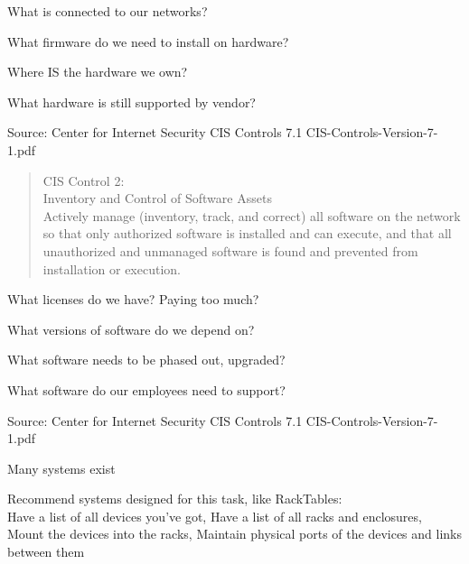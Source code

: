 \documentclass[Screen16to9,17pt]{foils}
\begin{document}
\begin{list1}
\item What is connected to our networks?
\item What firmware do we need to install on hardware?
\item Where IS the hardware we own?
\item What hardware is still supported by vendor?
\end{list1}

Source: Center for Internet Security CIS Controls 7.1 CIS-Controls-Version-7-1.pdf



\begin{quote}
CIS Control 2:\\
Inventory and Control of Software Assets\\
Actively manage (inventory, track, and correct) all software on the network so that only authorized software is installed and can execute, and that all unauthorized and unmanaged software is found and prevented from installation or execution.
\end{quote}

\begin{list1}
\item What licenses do we have? Paying too much?
\item What versions of software do we depend on?
\item What software needs to be phased out, upgraded?
\item What software do our employees need to support?
\end{list1}

Source: Center for Internet Security CIS Controls 7.1 CIS-Controls-Version-7-1.pdf




\begin{list2}
\item Many systems exist
\item Recommend systems designed for this task, like RackTables:\\
Have a list of all devices you've got,
Have a list of all racks and enclosures,
Mount the devices into the racks,
Maintain physical ports of the devices and links between them
\item {}
\end{list2}
\end{document}
